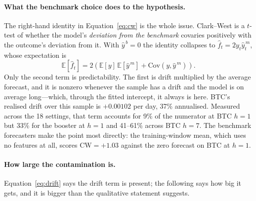\documentclass{article}
\theoremstyle{plain}
\theoremstyle{definition}
\begin{document}
\paragraph{What the benchmark choice does to the hypothesis.}
The right-hand identity in Equation~\eqref{eq:cw} is the whole issue. Clark--West
is a $t$-test of whether the model's \emph{deviation from the benchmark} covaries
positively with the outcome's deviation from it. With $\hat y^{\,b} = 0$ the
identity collapses to $\hat f_t = 2 y_t \hat y^{\,m}_t$, whose expectation is
%
\begin{equation}
  \mathbb{E}\!\left[\hat f_t\right] = 2\left(\mathbb{E}[y]\,\mathbb{E}[\hat y^{\,m}]
  + \mathrm{Cov}\!\left(y, \hat y^{\,m}\right)\right).
  \label{eq:drift}
\end{equation}
%
Only the second term is predictability. The first is drift multiplied by the
average forecast, and it is nonzero whenever the sample has a drift and the model
is on average long---which, through the fitted intercept, it always is here. BTC's
realised drift over this sample is $+0.00102$ per day, 37\% annualised. Measured
across the 18 settings, that term accounts for 9\% of the numerator at BTC $h=1$
but 33\% for the booster at $h=1$ and 41--61\% across BTC $h=7$. The benchmark
forecasters make the point most directly: the training-window mean, which uses no
features at all, scores $\mathrm{CW} = +1.03$ against the zero forecast on BTC at
$h=1$.

\paragraph{How large the contamination is.} Equation~\eqref{eq:drift} says the drift term is
present; the following says how big it gets, and it is bigger than the qualitative statement
suggests.
\end{document}
